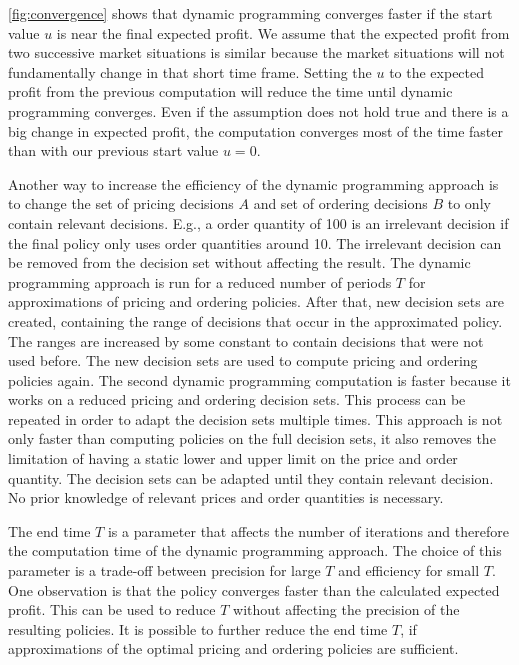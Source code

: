 \cref{fig:convergence} shows that dynamic programming converges faster if the start value $u$ is near the final expected profit.
We assume that the expected profit from two successive market situations is similar because the market situations will not fundamentally change in that short time frame.
Setting the $u$ to the expected profit from the previous computation will reduce the time until dynamic programming converges.
Even if the assumption does not hold true and there is a big change in expected profit, the computation converges most of the time faster than with our previous start value $u = 0$.

Another way to increase the efficiency of the dynamic programming approach is to change the set of pricing decisions $A$ and set of ordering decisions $B$ to only contain relevant decisions.
E.g., a order quantity of 100 is an irrelevant decision if the final policy only uses order quantities around 10.
The irrelevant decision can be removed from the decision set without affecting the result.
The dynamic programming approach is run for a reduced number of periods $T$ for approximations of pricing and ordering policies.
After that, new decision sets are created, containing the range of decisions that occur in the approximated policy.
The ranges are increased by some constant to contain decisions that were not used before.
The new decision sets are used to compute pricing and ordering policies again.
The second dynamic programming computation is faster because it works on a reduced pricing and ordering decision sets.
This process can be repeated in order to adapt the decision sets multiple times.
This approach is not only faster than computing policies on the full decision sets, it also removes the limitation of having a static lower and upper limit on the price and order quantity.
The decision sets can be adapted until they contain relevant decision.
No prior knowledge of relevant prices and order quantities is necessary.

The end time $T$ is a parameter that affects the number of iterations and therefore the computation time of the dynamic programming approach.
The choice of this parameter is a trade-off between precision for large $T$ and efficiency for small $T$.
One observation is that the policy converges faster than the calculated expected profit.
This can be used to reduce $T$ without affecting the precision of the resulting policies.
It is possible to further reduce the end time $T$, if approximations of the optimal pricing and ordering policies are sufficient.

